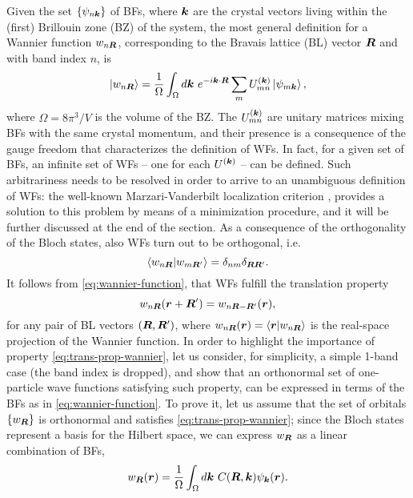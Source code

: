 Given the set $\{ \psi_{n{\bm k}} \}$ of BFs, where ${\bm k}$ are the crystal vectors living within the (first) Brillouin zone (BZ) of the system, the most general definition for a Wannier function $w_{n{\bm R}}$, corresponding to the Bravais lattice (BL) vector ${\bm R}$ and with band index $n$, is
%
\begin{equation}
    \ket{w_{n{\bm R}}} = \frac{1}{\Omega} \int_{\Omega} d{\bm k} \ e^{-i{\bm k} \cdot {\bm R}} \sum_m U^{({\bm k})}_{mn} \ket{\psi_{m{\bm k}}} ,
    \label{eq:wannier-function}
\end{equation}
%
where $\Omega = 8\pi^3 / V$ is the volume of the BZ. The $U^{({\bm k})}_{mn}$ are unitary matrices mixing BFs with the same crystal momentum, and their presence is a consequence of the gauge freedom that characterizes the definition of WFs. In fact, for a given set of BFs, an infinite set of WFs -- one for each $U^{({\bm k})}$ -- can be defined. Such arbitrariness needs to be resolved in order to arrive to an unambiguous definition of WFs: the well-known Marzari-Vanderbilt localization criterion \cite{marzari_maximally_1997}, provides a solution to this problem by means of a minimization procedure, and it will be further discussed at the end of the section. As a consequence of the orthogonality of the Bloch states, also WFs turn out to be orthogonal, i.e.
%
\begin{equation}
    \braket{w_{n{\bm R}} | w_{m{\bm R}'}} = \delta_{nm} \delta_{{\bm R} {\bm R}'} .
    \label{eq:orthogonality-wannier}
\end{equation}
%
It follows from \cref{eq:wannier-function}, that WFs fulfill the translation property
%
\begin{equation}
    w_{n{\bm R}}({\bm r} + {\bm R}') = w_{n{\bm R} - {\bm R}'}({\bm r}) ,
    \label{eq:trans-prop-wannier}
\end{equation}
%
for any pair of BL vectors $({\bm R},{\bm R}')$, where $w_{n{\bm R}}({\bm r}) = \braket{{\bm r}|w_{n{\bm R}}}$ is the real-space projection of the Wannier function. In order to highlight the importance of property \eqref{eq:trans-prop-wannier}, let us consider, for simplicity, a simple 1-band case (the band index is dropped), and show that an orthonormal set of one-particle wave functions satisfying such property, can be expressed in terms of the BFs as in \cref{eq:wannier-function}. To prove it, let us assume that the set of orbitals $\{ w_{{\bm R}} \}$ is orthonormal and satisfies \cref{eq:trans-prop-wannier}; since the Bloch states represent a basis for the Hilbert space, we can express $w_{{\bm R}}$ as a linear combination of BFs,
%
\begin{equation}
    w_{{\bm R}}({\bm r}) = \frac{1}{\Omega} \int_{\Omega} d{\bm k} \ C({\bm R},{\bm k}) \psi_{{\bm k}}({\bm r}) .
    \label{eq:wannier-bloch-linear-combination}
\end{equation}
